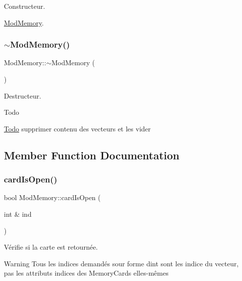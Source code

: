 Constructeur. 

\hyperlink{class_mod_memory}{Mod\+Memory}. \mbox{\label{class_mod_memory_a77d39288e861c84edcfa760170fbc44d}} 
\subsubsection{\texorpdfstring{$\sim$\+Mod\+Memory()}{~ModMemory()}}
{\footnotesize\ttfamily Mod\+Memory\+::$\sim$\+Mod\+Memory (\begin{DoxyParamCaption}{ }\end{DoxyParamCaption})}



Destructeur. 

\begin{DoxyRefDesc}{Todo}
\item[\hyperlink{todo__todo000011}{Todo}]supprimer contenu des vecteurs et les vider \end{DoxyRefDesc}


\subsection{Member Function Documentation}
\mbox{\label{class_mod_memory_a67247c021d8bf91192c2c32c1eb560ad}} 
\subsubsection{\texorpdfstring{card\+Is\+Open()}{cardIsOpen()}}
{\footnotesize\ttfamily bool Mod\+Memory\+::card\+Is\+Open (\begin{DoxyParamCaption}\item[{int \&}]{ind }\end{DoxyParamCaption})}



Vérifie si la carte est retournée. 

\begin{DoxyWarning}{Warning}
Tous les indices demandés sour forme d\textquotesingle{}int sont les indice du vecteur, pas les attributs indices des Memory\+Cards elles-\/mêmes 
\end{DoxyWarning}
\mbox{\label{class_mod_memory_a4e6581fef7b3adbad429bf4c39d38e88}} 
